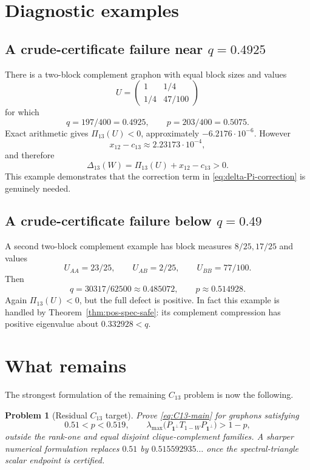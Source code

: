 \documentclass[11pt]{article}
\newtheorem{problem}[theorem]{Problem}
\newcommand{\one}{\mathbf 1}
\begin{document}
\section{Diagnostic examples}

\subsection{A crude-certificate failure near $q=0.4925$}

There is a two-block complement graphon with equal block sizes and values
\[
        U=\begin{pmatrix}1&1/4\\1/4&47/100\end{pmatrix}
\]
for which
\[
        q=197/400=0.4925,
        \qquad p=203/400=0.5075.
\]
Exact arithmetic gives $\Pi_{13}(U)<0$, approximately
$-6.2176\cdot10^{-6}$.  However
\[
        x_{12}-c_{13}\approx2.23173\cdot10^{-4},
\]
and therefore
\[
        \Delta_{13}(W)=\Pi_{13}(U)+x_{12}-c_{13}>0.
\]
This example demonstrates that the correction term in
\eqref{eq:delta-Pi-correction} is genuinely needed.

\subsection{A crude-certificate failure below $q=0.49$}

A second two-block complement example has block measures $8/25,17/25$ and
values
\[
        U_{AA}=23/25,
        \qquad U_{AB}=2/25,
        \qquad U_{BB}=77/100.
\]
Then
\[
        q=30317/62500\approx0.485072,
        \qquad p\approx0.514928.
\]
Again $\Pi_{13}(U)<0$, but the full defect is positive.  In fact this example
is handled by Theorem~\ref{thm:pos-spec-safe}: its complement compression has
positive eigenvalue about $0.332928<q$.

\section{What remains}

The strongest formulation of the remaining $C_{13}$ problem is now the
following.

\begin{problem}[Residual $C_{13}$ target]
Prove \eqref{eq:C13-main} for graphons satisfying
\[
        0.51<p<0.519,
        \qquad
        \lambda_{\max}\bigl(P_{\one^\perp}T_{1-W}P_{\one^\perp}\bigr)>1-p,
\]
outside the rank-one and equal disjoint clique-complement families.
A sharper numerical formulation replaces $0.51$ by
$0.515592935\ldots$ once the spectral-triangle scalar endpoint is certified.
\end{problem}
\end{document}
